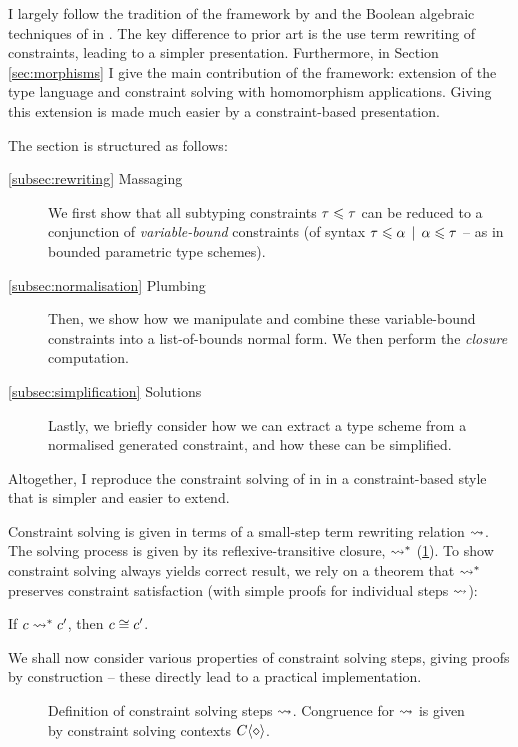 I largely follow the tradition of the framework by \textcite{pottier-framework} and the Boolean algebraic techniques of \textcite{mlstruct} in \mlstruct{}. The key difference to prior art is the use term rewriting of constraints, leading to a simpler presentation. Furthermore, in Section \ref{sec:morphisms} I give the main contribution of the framework: extension of the type language and constraint solving with homomorphism applications. Giving this extension is made much easier by a constraint-based presentation.

The section is structured as follows: \begin{description}
    \item[\ref{subsec:rewriting} Massaging] We first show that all subtyping constraints $\tau \leqslant \tau$ can be reduced to a conjunction of \emph{variable-bound} constraints (of syntax $\tau \leqslant \alpha \,\mid\, \alpha \leqslant \tau$ -- as in bounded parametric type schemes).
    \item[\ref{subsec:normalisation} Plumbing] Then, we show how we manipulate and combine these variable-bound constraints into a list-of-bounds normal form. We then perform the \emph{closure} computation.
    \item[\ref{subsec:simplification} Solutions] Lastly, we briefly consider how we can extract a type scheme from a normalised generated constraint, and how these can be simplified.
\end{description} 
Altogether, I reproduce the constraint solving of \textcite{mlstruct} in \mlstruct{} in a constraint-based style that is simpler and easier to extend. 

Constraint solving is given in terms of a small-step term rewriting relation $\leadsto$. The solving process is given by its reflexive-transitive closure, $\leadsto^*$ (\ref{fig:solver}).
To show constraint solving always yields correct result, we rely on a theorem that $\leadsto^*$ preserves constraint satisfaction (with simple proofs for individual steps $\leadsto$):
\begin{theorem}
    If $c \leadsto^* c'$, then $c \cong c'$.
\end{theorem}
We shall now consider various properties of constraint solving steps, giving proofs by construction -- these directly lead to a practical implementation.

\begin{figure}
    \centering
    
    \caption{Definition of constraint solving steps $\leadsto$. Congruence for $\leadsto$ is given by constraint solving contexts $\solvectx$.}
    \label{fig:solver}
\end{figure}

